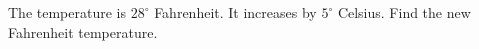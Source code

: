 The temperature is $28^\circ$ Fahrenheit. It increases by $5^\circ$ Celsius. Find the new Fahrenheit temperature.
